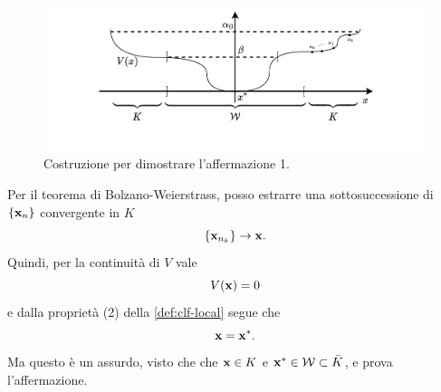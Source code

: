\begin{steps}
    \hfill
    \begin{minipage}{.8\textwidth}
        \begin{figure}[H]
            \centering
            \includegraphics[width=\textwidth,clip,trim=2.2cm 1cm 2.2cm 0]{assets/ljapunov-dim-aff1}
            \caption[Costruzione 1 per teorema di Ljapunov]{Costruzione per dimostrare
            l'affermazione 1.}
            \label{fig:ljapunov-dim-aff1}
        \end{figure}
    \end{minipage}

    Per il teorema di Bolzano-Weierstrass\footnotemark, posso estrarre una
    sottosuccessione di $\{\mathbf{x}_n\}$ convergente in $K$
    \begin{equation*}
    \{\mathbf{x}_ {n_k}\} \to \mathbf{x}.
    \end{equation*}
    Quindi, per la continuità di $V$ vale
    \begin{equation*}
        V(\mathbf{x}) = 0
    \end{equation*}
    e dalla proprietà (2) della \autoref{def:clf-local}
    segue che
    \begin{equation*}
        \mathbf{x} = \mathbf{x}^*.
    \end{equation*}
    Ma questo è un assurdo, visto che che $\mathbf{x} \in K$
    e $\mathbf{x}^* \in \mathcal W \subset \bar K$, e prova l'affermazione.

    \hfill\openbox\paragraph{}



\end{steps}
